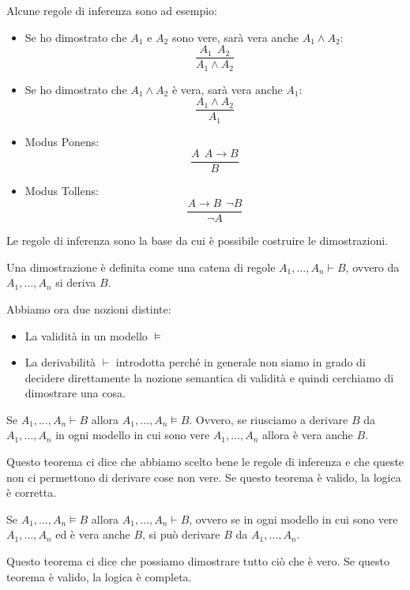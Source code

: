 Alcune regole di inferenza sono ad esempio:
\begin{itemize}
    \item Se ho dimostrato che $A_1$ e $A_2$ sono vere, sarà vera anche $A_1 \land A_2$: 
    \begin{equation}
        \frac{A_1 \ \ A_2}{A_1 \land A_2}
    \end{equation}
        \item Se ho dimostrato che $A_1 \land A_2$ è vera, sarà vera anche $A_1$: 
    \begin{equation}
        \frac{A_1 \land A_2}{A_1}
    \end{equation}
    \item Modus Ponens:
    \begin{equation}
        \frac{A \ \ A \to B}{B}
    \end{equation}
    \item Modus Tollens:
    \begin{equation}
        \frac{A \to B \ \ \lnot B}{\lnot A}
    \end{equation}
\end{itemize}

Le regole di inferenza sono la base da cui è possibile costruire le dimostrazioni.
\begin{definizione}
    Una dimostrazione è definita come una catena di regole $A_1,\dots, A_n \vdash B$, ovvero da $A_1, \dots, A_n$ si deriva $B$.  
\end{definizione}
Abbiamo ora due nozioni distinte:
\begin{itemize}
    \item La validità in un modello $\models$
    \item La derivabilità $\vdash$ introdotta perché in generale non siamo in grado di decidere direttamente la nozione semantica di validità e quindi cerchiamo di dimostrare una cosa.
\end{itemize}
\begin{teorema}
    Se $A_1, \dots, A_n \vdash B$ allora $A_1, \dots, A_n \models B$. Ovvero, se riusciamo a derivare $B$ da $A_1, \dots, A_n$ in ogni modello in cui sono vere $A_1, \dots, A_n$ allora è vera anche $B$.
\end{teorema}
Questo teorema ci dice che abbiamo scelto bene le regole di inferenza e che queste non ci permettono di derivare cose non vere. Se questo teorema è valido, la logica è corretta.
\begin{teorema}
    Se $A_1, \dots, A_n \models B$ allora $A_1, \dots, A_n \vdash B$, ovvero se in ogni modello in cui sono vere $A_1, \dots, A_n$ ed è vera anche $B$, si può derivare $B$ da $A_1, \dots, A_n$.
\end{teorema}
Questo teorema ci dice che possiamo dimostrare tutto ciò che è vero. Se questo teorema è valido, la logica è completa.
